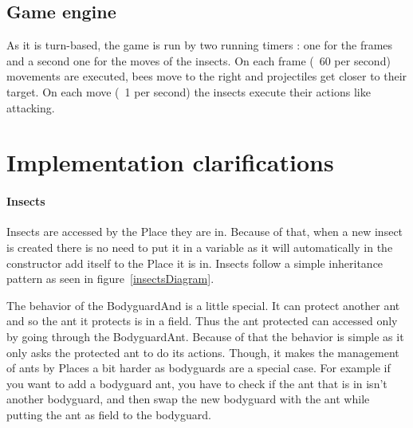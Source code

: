 \documentclass[
	a4paper
]{article}
\begin{document}
	\subsection{Game engine}
	
	As it is turn-based, the game is run by two running timers : one for the frames and a second one for the moves of the insects. %
On each frame (~60 per second) movements are executed, bees move to the right and projectiles get closer to their target. %
On each move (~1 per second) the insects execute their actions like attacking.


\section{Implementation clarifications} %

\paragraph{Insects} Insects are accessed by the Place they are in. Because of that, when a new insect is created there is no need to put it in a variable as it will automatically in the constructor add itself to the Place it is in.
Insects follow a simple inheritance pattern as seen in figure~\ref{insectsDiagram}.

The behavior of the BodyguardAnd is a little special. It can protect another ant and so the ant it protects is in a field. Thus the ant protected can accessed only by going through the BodyguardAnt. Because of that the behavior is simple as it only asks the protected ant to do its actions. Though, it makes the management of ants by Places a bit harder as bodyguards are a special case. For example if you want to add a bodyguard ant, you have to check if the ant that is in isn't another bodyguard, and then swap the new bodyguard with the ant while putting the ant as field to the bodyguard.
\end{document}

